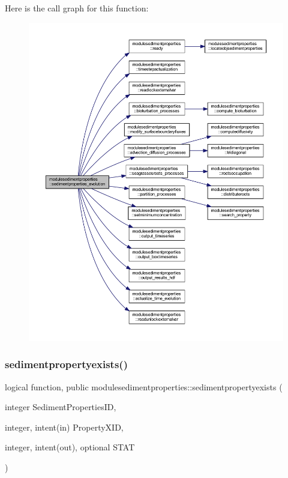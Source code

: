Here is the call graph for this function\+:\nopagebreak
\begin{figure}[H]
\begin{center}
\leavevmode
\includegraphics[width=350pt]{namespacemodulesedimentproperties_ac0e9a7cb95c81a6f95797a7750889730_cgraph}
\end{center}
\end{figure}
\mbox{\label{namespacemodulesedimentproperties_a5b50162eeb042d1b89c4fc2ed2edfa45}} 
\subsubsection{\texorpdfstring{sedimentpropertyexists()}{sedimentpropertyexists()}}
{\footnotesize\ttfamily logical function, public modulesedimentproperties\+::sedimentpropertyexists (\begin{DoxyParamCaption}\item[{integer}]{Sediment\+Properties\+ID,  }\item[{integer, intent(in)}]{Property\+X\+ID,  }\item[{integer, intent(out), optional}]{S\+T\+AT }\end{DoxyParamCaption})}

